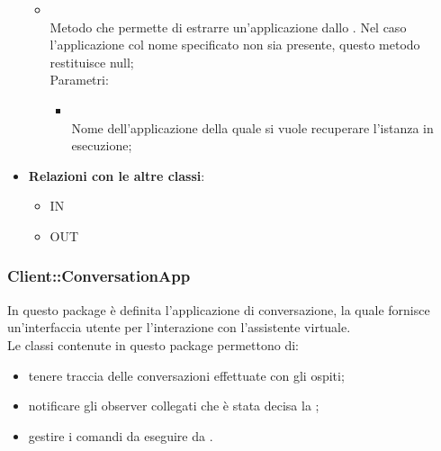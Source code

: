 \begin{itemize}
\begin{itemize}
\begin{itemize}
		\end{itemize}
		\item[]  \\		Metodo che permette di estrarre un'applicazione dallo . Nel caso l'applicazione col nome specificato non sia presente, questo metodo restituisce null;\\
		Parametri:
		\begin{itemize}
			\item {} \\
			Nome dell'applicazione della quale si vuole recuperare l'istanza in esecuzione;
		\end{itemize}
	\end{itemize}
	\item \textbf{Relazioni con le altre classi}:
	\begin{itemize}
		\item IN \hyperlink{Manager_label}{}
		\item OUT \hyperlink{Application_label}{}
	\end{itemize}
\end{itemize}
\FloatBarrier
\newpage
\subsubsection{Client::ConversationApp}
In questo package è definita l'applicazione di conversazione, la quale fornisce un'interfaccia utente per l'interazione con l'assistente virtuale.\\
Le classi contenute in questo package permettono di:
\begin{itemize}
\item tenere traccia delle conversazioni effettuate con gli ospiti;
\item notificare gli observer collegati che è stata decisa la ;
\item gestire i comandi da eseguire da .
\end{itemize}

